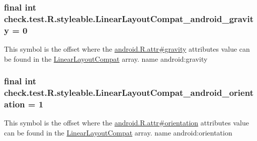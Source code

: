 \subsubsection[{Linear\+Layout\+Compat\+\_\+android\+\_\+gravity}]{\setlength{\rightskip}{0pt plus 5cm}final int check.\+test.\+R.\+styleable.\+Linear\+Layout\+Compat\+\_\+android\+\_\+gravity = 0\hspace{0.3cm}{\ttfamily [static]}}\label{classcheck_1_1test_1_1_r_1_1styleable_abe8ac977e2400616ce150828d8ec6a26}
This symbol is the offset where the \hyperlink{}{android.\+R.\+attr\#gravity} attribute\textquotesingle{}s value can be found in the \hyperlink{classcheck_1_1test_1_1_r_1_1styleable_a1cee5a37a541e5cb360983f35ebfe0fc}{Linear\+Layout\+Compat} array.  name android\+:gravity \hypertarget{classcheck_1_1test_1_1_r_1_1styleable_a7888ca0cf0cdae867cd8a4826d080062}{}
\subsubsection[{Linear\+Layout\+Compat\+\_\+android\+\_\+orientation}]{\setlength{\rightskip}{0pt plus 5cm}final int check.\+test.\+R.\+styleable.\+Linear\+Layout\+Compat\+\_\+android\+\_\+orientation = 1\hspace{0.3cm}{\ttfamily [static]}}\label{classcheck_1_1test_1_1_r_1_1styleable_a7888ca0cf0cdae867cd8a4826d080062}
This symbol is the offset where the \hyperlink{}{android.\+R.\+attr\#orientation} attribute\textquotesingle{}s value can be found in the \hyperlink{classcheck_1_1test_1_1_r_1_1styleable_a1cee5a37a541e5cb360983f35ebfe0fc}{Linear\+Layout\+Compat} array.  name android\+:orientation \hypertarget{classcheck_1_1test_1_1_r_1_1styleable_ae245bae0548f5ad66ca9cf0a1cdb45b4}{}

